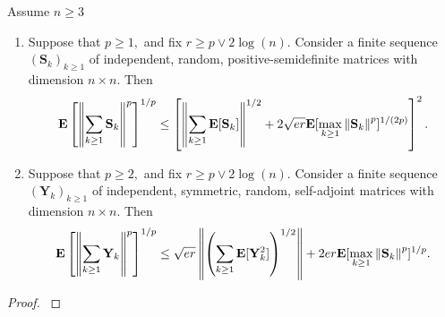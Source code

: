 \begin{ftheorem}
  Assume $n\ge 3$
  \begin{enumerate}[label={(\roman*)}]
    \item
  Suppose that
  $
    p \ge 1
    ,
  $
  and fix
  $
    r
    \ge
    p
    \lor
    2\log(n)
    .
  $
  Consider a finite sequence
  $
    (\mathbf{S}_k)_{k\ge 1}
  $
  of independent, random, positive-semidefinite matrices 
  with dimension 
  $
    n\times n.
  $
  Then
  \begin{gather}
      \mathbf{E}
      \left[
        \left\lVert
          \sum_{k\ge 1}
            \mathbf{S}_k
        \right\rVert
        ^{p}
      \right]
      ^{1/p}
      \le
      \left[ 
        \left\lVert
          \sum_{k\ge 1}
          \mathbf{E}
          [
            \mathbf{S}_k
          ]
        \right\rVert^{1/2}
        +
        2
        \sqrt{e r}
        \mathbf{E}
        [
          \max_{k\ge 1}
          \left\lVert
            \mathbf{S}_k
          \right\rVert
          ^p
        ]
        ^{1/(2p)}
      \right]
      ^2
      .
  \end{gather}
    \item
  Suppose that
  $
    p \ge 2
    ,
  $
  and fix
  $
    r
    \ge
    p
    \lor
    2\log(n)
    .
  $
  Consider a finite sequence
  $
    (\mathbf{Y}_k)_{k\ge 1}
  $
  of independent, symmetric, random, self-adjoint matrices 
  with dimension 
  $
    n\times n.
  $
  Then
  \begin{gather}
      \mathbf{E}
      \left[
        \left\lVert
          \sum_{k\ge 1}
            \mathbf{Y}_k
        \right\rVert
        ^{p}
      \right]
      ^{1/p}
      \le
        \sqrt{e r}
        \left\lVert
          \left( 
          \sum_{k\ge 1}
          \mathbf{E}
          [
            \mathbf{Y}_k^2
          ]
          \right)
          ^{1/2}
        \right\rVert
        +
        2
        er
        \mathbf{E}
        [
          \max_{k\ge 1}
          \left\lVert
            \mathbf{S}_k
          \right\rVert
          ^p
        ]
        ^{1/p}
      .
  \end{gather}

  \end{enumerate}
\end{ftheorem}
\begin{proof}
  \cite[Theorem A.1]{Chen2012}
\end{proof}
 
